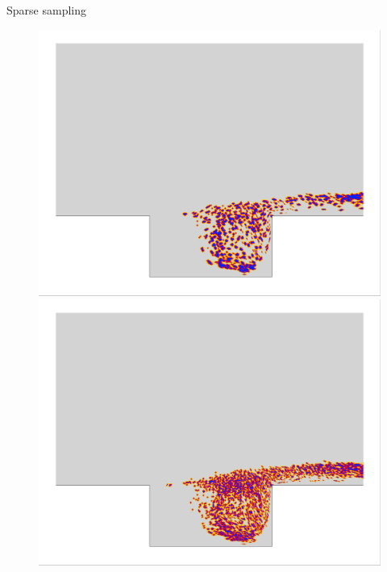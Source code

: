 \documentclass[]{beamer}
\begin{document}
\begin{frame}{Sparse sampling}
\begin{figure}
		\begin{minipage}{0.49\linewidth}
			\centering
			\includegraphics[width=0.63\linewidth,trim={0.5em 0.5em 0.5em 0.5em},clip]{Images/experiments/2d_cavity/iblank/iBlank_greedy_carlberg_zoom.png}
		\end{minipage}
		\begin{minipage}{0.49\linewidth}
			\centering
			\includegraphics[width=0.63\linewidth,trim={0.5em 0.5em 0.5em 0.5em},clip]{Images/experiments/2d_cavity/iblank/iBlank_greedy_ben_zoom.png}
		\end{minipage}
	\end{figure}
\end{frame}
\end{document}
